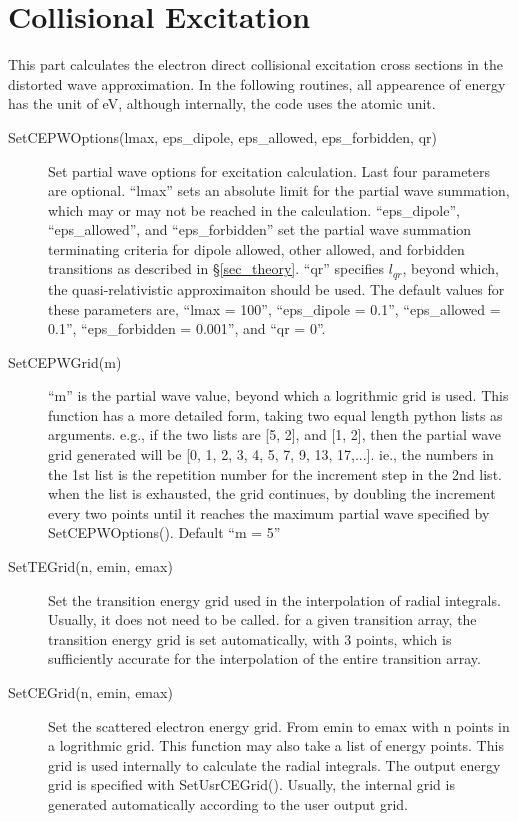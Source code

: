 \documentclass[12pt]{article}
\begin{document}
\section{Collisional Excitation}
This part calculates the electron direct collisional excitation cross
sections in the distorted wave approximation. In the following routines, all
appearence of energy has the unit of eV, although internally, the code uses
the atomic unit.

\begin{description}
\item[SetCEPWOptions(lmax, eps\_dipole, eps\_allowed, eps\_forbidden, qr)] 
Set partial wave options for excitation calculation. Last four parameters are
optional. ``lmax'' sets an absolute limit for the partial wave 
summation, which may or may not be reached in the calculation. ``eps\_dipole'',
``eps\_allowed'', and ``eps\_forbidden'' set the partial wave summation
terminating criteria for dipole allowed, other allowed, and forbidden
transitions as described in \S\ref{sec_theory}. ``qr'' specifies $l_{qr}$,
beyond which, the quasi-relativistic approximaiton should be used. The default
values for these parameters are, ``lmax = 100'', ``eps\_dipole = 0.1'',
``eps\_allowed = 0.1'', ``eps\_forbidden = 0.001'', and ``qr = 0''. 

\item[SetCEPWGrid(m)] 
``m'' is the partial wave value, beyond which a logrithmic
grid is used. This function has a more detailed form, taking two equal length
python lists as arguments. e.g., if the two lists are [5, 2], and [1, 2], then
the partial wave grid generated will be [0, 1, 2, 3, 4, 5, 7, 9, 13, 17,...].
ie., the numbers in the 1st list is the repetition number for the increment
step in the 2nd list. when the list is exhausted, the grid continues, by
doubling the increment every two points until it reaches the maximum partial
wave specified by SetCEPWOptions(). Default ``m = 5''

\item[SetTEGrid(n, emin, emax)] 
Set the transition energy grid used in the
interpolation of radial integrals. Usually, it does not need to be
called. for a given transition array, the transition energy grid is set
automatically, with 3 points, which is sufficiently accurate for the
interpolation of the entire transition array. 

\item[SetCEGrid(n, emin, emax)] 
Set the scattered electron energy grid. From emin to emax with n points in a
logrithmic grid. This function may also take a list of energy points. This
grid is used internally to calculate the radial integrals. The output energy
grid is specified with SetUsrCEGrid(). Usually, the internal grid is generated
automatically according to the user output grid. 


\end{description}
\end{document}
